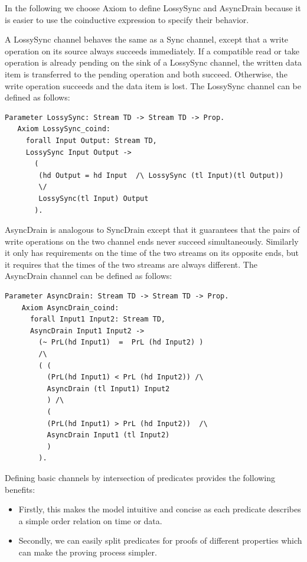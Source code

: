 \documentclass[3p,times]{elsarticle}
\begin{document}
In the following we choose Axiom to define LossySync and AsyncDrain
because it is easier to use the coinductive expression to specify
their behavior.

A LossySync channel behaves the same as a Sync channel, except that a write operation on its source always succeeds immediately. If a compatible read or take operation is already pending on the sink of a LossySync channel, the written data item is transferred to the pending operation and both succeed. Otherwise, the write operation succeeds and the data item is lost. The LossySync channel can be defined as follows:
\begin{lstlisting}[language=coq]
   Parameter LossySync: Stream TD -> Stream TD -> Prop.
   Axiom LossySync_coind:
     forall Input Output: Stream TD,
     LossySync Input Output ->
       (
        (hd Output = hd Input  /\ LossySync (tl Input)(tl Output))
        \/
        LossySync(tl Input) Output
       ).
\end{lstlisting}

AsyncDrain is analogous to SyncDrain except that it guarantees that the pairs of write operations on the two channel ends never succeed simultaneously. Similarly it only has requirements on the time of the two streams on its opposite ends, but it requires that the times of the two streams are always different. The AsyncDrain channel can be defined as follows:
\begin{lstlisting}[language=coq]
    Parameter AsyncDrain: Stream TD -> Stream TD -> Prop.
    Axiom AsyncDrain_coind:
      forall Input1 Input2: Stream TD,
      AsyncDrain Input1 Input2 ->
        (~ PrL(hd Input1)  =  PrL (hd Input2) )
        /\
        ( (
          (PrL(hd Input1) < PrL (hd Input2)) /\
          AsyncDrain (tl Input1) Input2
          ) /\
          (
          (PrL(hd Input1) > PrL (hd Input2))  /\
          AsyncDrain Input1 (tl Input2)
          )
        ).
\end{lstlisting}

Defining basic channels by intersection of predicates provides the following benefits:
\begin{itemize}
\item Firstly, this makes the model intuitive and concise as each predicate describes a simple order relation on time or data.
\item Secondly, we can easily split predicates for proofs of different properties which can make the proving process simpler.
\end{itemize}
\end{document}
